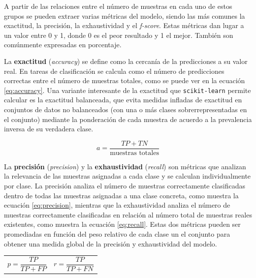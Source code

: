 A partir de las relaciones entre el número de muestras en cada uno de estos grupos se pueden extraer varias métricas del modelo, siendo las más comunes la exactitud, la precisión, la exhaustividad y el \emph{f-score}\cite{scikit-model-eval}. Estas métricas dan lugar a un valor entre 0 y 1, donde 0 es el peor resultado y 1 el mejor. También son comúnmente expresadas en porcentaje.

La \textbf{exactitud} (\emph{accuracy}) se define como la cercanía de la predicciones a su valor real. En tareas de clasificación se calcula como el número de predicciones correctas entre el número de muestras totales, como se puede ver en la ecuación \ref{eq:accuracy}. Una variante interesante de la exactitud que \texttt{scikit-learn} permite calcular es la exactitud balanceada, que evita medidas infladas de exactitud en conjuntos de datos no balanceados (con una o más clases sobrerrepresentadas en el conjunto) mediante la ponderación de cada muestra de acuerdo a la prevalencia inversa de su verdadera clase.

\begin{equation}
    a = \dfrac{TP+TN}{\text{muestras totales}}
\label{eq:accuracy}
\end{equation}

La \textbf{precisión} (\emph{precision}) y la \textbf{exhaustividad} (\emph{recall}) son métricas que analizan la relevancia de las muestras asignadas a cada clase y se calculan individualmente por clase. La precisión analiza el número de muestras correctamente clasificadas dentro de todas las muestras asignadas a una clase concreta, como muestra la ecuación \ref{eq:precision}, mientras que la exhaustividad analiza el número de muestras correctamente clasificadas en relación al número total de muestras reales existentes, como muestra la ecuación \ref{eq:recall}. Estas dos métricas pueden ser promediadas en función del peso relativo de cada clase un el conjunto para obtener una medida global de la precisión y exhaustividad del modelo.

\noindent
\begin{tabular}{@{}p{.4\linewidth}@{}p{.6\linewidth}@{}}
  \begin{equation}
     p = \dfrac{TP}{TP + FP}
  \label{eq:precision}
  \end{equation}
  &
  \begin{equation}
    r = \dfrac{TP}{TP + FN}
  \label{eq:recall}
  \end{equation}
\end{tabular}

